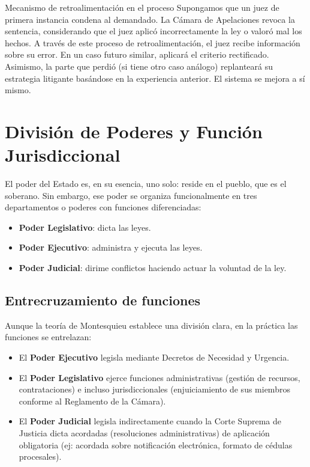 \documentclass[12pt,oneside]{book}
\begin{document}
\begin{example}{Mecanismo de retroalimentación en el proceso}
Supongamos que un juez de primera instancia condena al demandado. La Cámara de Apelaciones revoca la sentencia, considerando que el juez aplicó incorrectamente la ley o valoró mal los hechos. A través de este proceso de retroalimentación, el juez recibe información sobre su error. En un caso futuro similar, aplicará el criterio rectificado. Asimismo, la parte que perdió (si tiene otro caso análogo) replanteará su estrategia litigante basándose en la experiencia anterior. El sistema se mejora a sí mismo.
\end{example}


\chapter{División de Poderes y Función Jurisdiccional}

El poder del Estado es, en su esencia, uno solo: reside en el pueblo, que es el soberano. Sin embargo, ese poder se organiza funcionalmente en tres departamentos o poderes con funciones diferenciadas:

\begin{itemize}
    \item \textbf{Poder Legislativo}: dicta las leyes.
    \item \textbf{Poder Ejecutivo}: administra y ejecuta las leyes.
    \item \textbf{Poder Judicial}: dirime conflictos haciendo actuar la voluntad de la ley.
\end{itemize}

\section{Entrecruzamiento de funciones}

Aunque la teoría de Montesquieu establece una división clara, en la práctica las funciones se entrelazan:

\begin{itemize}
    \item El \textbf{Poder Ejecutivo} legisla mediante Decretos de Necesidad y Urgencia.
    \item El \textbf{Poder Legislativo} ejerce funciones administrativas (gestión de recursos, contrataciones) e incluso jurisdiccionales (enjuiciamiento de sus miembros conforme al Reglamento de la Cámara).
    \item El \textbf{Poder Judicial} legisla indirectamente cuando la Corte Suprema de Justicia dicta acordadas (resoluciones administrativas) de aplicación obligatoria (ej: acordada sobre notificación electrónica, formato de cédulas procesales).
\end{itemize}
\end{document}
